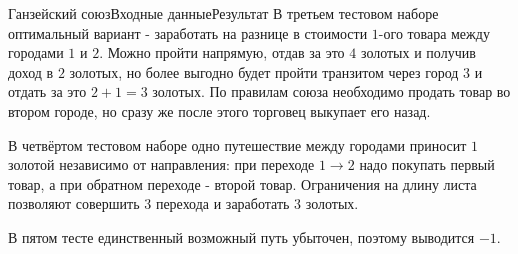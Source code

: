 \begin{problem}{Ганзейский союз}{Входные данные}{Результат}{}
В третьем тестовом наборе оптимальный вариант - заработать на разнице в стоимости $1$-ого товара между городами $1$ и $2$.
Можно пройти напрямую, отдав за это $4$ золотых и получив доход в $2$ золотых, но более выгодно будет пройти транзитом через город $3$ и отдать за это $2 + 1 = 3$ золотых.
По правилам союза необходимо продать товар во втором городе, но сразу же после этого торговец выкупает его назад.

В четвёртом тестовом наборе одно путешествие между городами приносит $1$ золотой независимо от направления: при переходе $1 \rightarrow 2$ надо покупать первый товар, а при обратном переходе - второй товар.
Ограничения на длину листа позволяют совершить $3$ перехода и заработать $3$ золотых.

В пятом тесте единственный возможный путь убыточен, поэтому выводится $-1$.

\end{problem}
